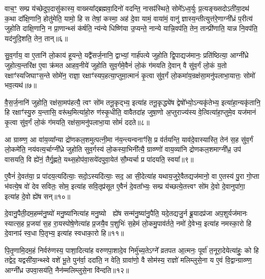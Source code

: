वाच॒ꣳ॒ सम्प्र य॑च्छेदुप॒दासु॑कास्य॒ वाख्स्या᳚द्ब्रह्मवा॒दिनो॑ वदन्ति॒ नासꣴ॑स्थिते॒ सोमे᳚\-ऽध्व॒र्युः प्र॒त्यङ्ख्सदो\-ऽती॑या॒दथ॑ क॒था दा᳚क्षि॒णानि॒ होतु॑मेति॒ यामो॒ हि स तेषां॒ कस्मा॒ अह॑ दे॒वा यामं॒ वाया॑मं॒ वानु॑ ज्ञास्य॒न्तीत्युत्त॑रे॒णाग्नी᳚ध्रं प॒रीत्य॑ जुहोति दाक्षि॒णानि॒ न प्रा॒णान्थ्सं क॑र्\mbox{}षति॒ न्य॑न्ये धिष्णि॑या उ॒प्यन्ते॒ नान्ये यान्नि॒वप॑ति॒ तेन॒ तान्प्री॑णाति॒ यान्न नि॒वप॑ति॒ यद॑नुदि॒शति॒ तेन॒ तान्॥६॥

{\anuvakamend[{स्तु॒ते वि॒न्दते॒ हि वी॑यन्ते प्र॒तीची॑रुद्गा॒त्र उ॒प्यन्ते॒ चतु॑र्दश च॥१॥}]}

सु॒व॒र्गाय॒ वा ए॒तानि॑ लो॒काय॑ हूयन्ते॒ यद्वै॑सर्ज॒नानि॒ द्वाभ्यां॒ गार्\mbox{}ह॑पत्ये जुहोति द्वि॒पाद्यज॑मानः॒ प्रति॑ष्ठित्या॒ आग्नी᳚ध्रे जुहोत्य॒न्तरि॑क्ष ए॒वा क्र॑मत आहव॒नीये॑ जुहोति सुव॒र्गमे॒वैनं॑ लो॒कं ग॑मयति दे॒वान् वै सु॑व॒र्गं लो॒कं य॒तो रक्षाꣳ॑स्यजिघाꣳस॒न्ते सोमे॑न॒ राज्ञा॒ रक्षाꣳ॑स्यप॒हत्या॒प्तुमा॒त्मानं॑ कृ॒त्वा सु॑व॒र्गं लो॒कमा॑य॒न्रक्ष॑सा॒मनु॑पलाभा॒यात्तः॒ सोमो॑ भव॒त्यथ॑॥७॥

वै॒स॒र्ज॒नानि॑ जुहोति॒ रक्ष॑सा॒मप॑हत्यै॒ त्वꣳ सो॑म तनू॒कृद्भ्य॒ इत्या॑ह तनू॒कृद्ध्ये॑ष द्वेषो᳚भ्यो॒\-ऽन्यकृ॑तेभ्य॒ इत्या॑हा॒न्यकृ॑तानि॒ हि रक्षाꣳ॑स्यु॒रु य॒न्तासि॒ वरू॑थ॒मित्या॑हो॒रु ण॑स्कृ॒धीति॒ वावैतदा॑ह जुषा॒णो अ॒प्तुराज्य॑स्य वे॒त्वित्या॑हा॒प्तुमे॒व यज॑मानं कृ॒त्वा सु॑व॒र्गं लो॒कं ग॑मयति॒ रक्ष॑सा॒मनु॑पलाभा॒या सोमं॑ ददते॥८॥

आ ग्राव्ण्ण॒ आ वा॑य॒व्या᳚न्या द्रो॑णकल॒शमुत्पत्नी॒मा न॑य॒न्त्यन्वनाꣳ॑सि॒ प्र व॑र्तयन्ति॒ याव॑दे॒वास्यास्ति॒ तेन॑ स॒ह सु॑व॒र्गं लो॒कमे॑ति॒ नय॑वत्य॒र्चाग्नी᳚ध्रे जुहोति सुव॒र्गस्य॑ लो॒कस्या॒भिनी᳚त्यै॒ ग्राव्ण्णो॑ वाय॒व्या॑नि द्रोणकल॒शमाग्नी᳚ध्र॒ उप॑ वासयति॒ वि ह्ये॑नं॒ तैर्गृ॒ह्णते॒ यथ्स॒होप॑वा॒सये॑दपुवा॒येत॑ सौ॒म्यर्चा प्र पा॑दयति॒ स्वया᳚॥९॥

ए॒वैनं॑ दे॒वत॑या॒ प्र पा॑दय॒त्यदि॑त्याः॒ सदो॒\-ऽस्यदि॑त्याः॒ सद॒ आ सी॒देत्या॑ह यथाय॒जुरे॒वैतद्यज॑मानो॒ वा ए॒तस्य॑ पु॒रा गो॒प्ता भ॑वत्ये॒ष वो॑ देव सवितः॒ सोम॒ इत्या॑ह सवि॒तृप्र॑सूत ए॒वैनं॑ दे॒वता᳚भ्यः॒ सम्प्र य॑च्छत्ये॒तत्त्वꣳ सो॑म दे॒वो दे॒वानुपा॑गा॒ इत्या॑ह दे॒वो ह्ये॑ष सन्॥१०॥

दे॒वानु॒पैती॒दम॒हम्म॑नु॒ष्यो॑ मनु॒ष्या॑नित्या॑ह मनु॒ष्यो  ह्ये॑ष सन्म॑नु॒ष्या॑नु॒पैति॒ यदे॒तद्यजु॒र्न ब्रू॒यादप्र॑जा अप॒शुर्यज॑मानः स्यात्स॒ह प्र॒जया॑ स॒ह रा॒यस्पोषे॒णेत्या॑ह प्र॒जयै॒व प॒शुभिः॑ स॒हेमं लो॒कमु॒पाव॑र्तते॒ नमो॑ दे॒वेभ्य॒ इत्या॑ह नमस्का॒रो हि दे॒वानाꣴ॑ स्व॒धा पि॒तृभ्य॒ इत्या॑ह स्वधाका॒रो हि॥११॥

पि॒तृ॒णामि॒दम॒हं निर्वरु॑णस्य॒ पाशा॒दित्या॑ह वरुणपा॒शादे॒व निर्मु॑च्य॒ते\-ऽग्ने᳚ व्रतपत आ॒त्मनः॒ पूर्वा॑ त॒नूरा॒देयेत्या॑हुः॒ को हि तद्वेद॒ यद्वसी॑या॒न्थ्स्वे वशे॑ भू॒ते पुन॑र्वा॒ ददा॑ति॒ न वेति॒ ग्रावा॑णो॒ वै सोम॑स्य॒ राज्ञो॑ मलिम्लुसे॒ना य ए॒वं वि॒द्वान्ग्राव्ण्ण॒ आग्नी᳚ध्र उपवा॒सय॑ति॒ नैन॑म्मलिम्लुसे॒ना वि॑न्दति॥१२॥


